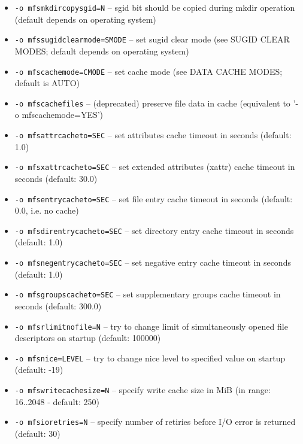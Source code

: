 \documentclass[a4paper,11pt,english]{report}
\def\code#1{\texttt{#1}}
\begin{document}
\begin{itemize}
					\item \code{-o mfsmkdircopysgid=N}
						-- sgid bit should be copied during mkdir operation (default depends on operating system)

					\item \code{-o mfssugidclearmode=SMODE}
						-- set sugid clear mode (see SUGID CLEAR MODES; default depends on operating system)

					\item \code{-o mfscachemode=CMODE}
						-- set cache mode (see DATA CACHE MODES; default is AUTO)

					\item \code{-o mfscachefiles}
						-- (deprecated) preserve file data in cache (equivalent to '-o mfscachemode=YES')

					\item \code{-o mfsattrcacheto=SEC}
						-- set attributes cache timeout in seconds (default: 1.0)

					\item \code{-o mfsxattrcacheto=SEC}
						-- set extended attributes (xattr) cache timeout in seconds (default: 30.0)

					\item \code{-o mfsentrycacheto=SEC}
						-- set file entry cache timeout in seconds (default: 0.0,  i.e. no cache)

					\item \code{-o mfsdirentrycacheto=SEC}
						-- set directory entry cache timeout in seconds (default: 1.0)

					\item \code{-o mfsnegentrycacheto=SEC}
						-- set negative entry cache timeout in seconds (default: 1.0)

					\item \code{-o mfsgroupscacheto=SEC}
						-- set supplementary groups cache timeout in seconds (default: 300.0)

					\item \code{-o mfsrlimitnofile=N}
						-- try to change limit of simultaneously opened file descriptors on startup (default: 100000)

					\item \code{-o mfsnice=LEVEL}
						-- try to change nice level to specified value on startup (default: -19)

					\item \code{-o mfswritecachesize=N}
						-- specify  write  cache size in MiB (in range: 16..2048 - default: 250)

					\item \code{-o mfsioretries=N}
						-- specify  number  of  retiries  before  I/O  error  is   returned (default: 30)
				\end{itemize}
				
\end{document}
